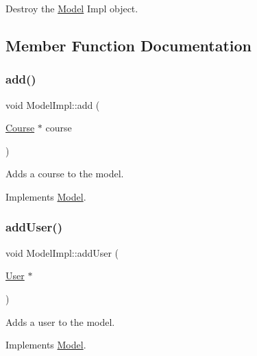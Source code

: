 Destroy the \hyperlink{classModel}{Model} Impl object. 



\subsection{Member Function Documentation}
\mbox{\label{classModelImpl_a1847f819acc9bf909e31ec3438973225}} 
\subsubsection{\texorpdfstring{add()}{add()}}
{\footnotesize\ttfamily void Model\+Impl\+::add (\begin{DoxyParamCaption}\item[{\hyperlink{classCourse}{Course} $\ast$}]{course }\end{DoxyParamCaption})\hspace{0.3cm}{\ttfamily [virtual]}}



Adds a course to the model. 



Implements \hyperlink{classModel_aff2385b433de34af14232ec8f7db126e}{Model}.

\mbox{\label{classModelImpl_aa0c7acd29ab42d13227e0e85fea044c8}} 
\subsubsection{\texorpdfstring{add\+User()}{addUser()}}
{\footnotesize\ttfamily void Model\+Impl\+::add\+User (\begin{DoxyParamCaption}\item[{\hyperlink{classUser}{User} $\ast$}]{ }\end{DoxyParamCaption})\hspace{0.3cm}{\ttfamily [virtual]}}



Adds a user to the model. 



Implements \hyperlink{classModel_ab6bf3b0428a4b087e8126c4b203bfc45}{Model}.

\mbox{\label{classModelImpl_a9bcdb7f3c69ac4f86f253a9422ae6ce9}} 
